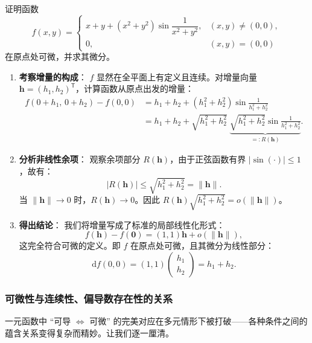 \documentclass[lang=cn,11pt]{elegantbook}
\begin{document}
\begin{exercise}[证明某函数在原点可微] \label{ex:diff-prove}
证明函数
\[
f(x,y)=
\begin{cases}
x+y+(x^2+y^2)\sin\dfrac{1}{x^2+y^2},&(x,y) \neq (0,0),\\[8pt]
0,&(x,y)=(0,0)
\end{cases}
\]
在原点处可微，并求其微分。
\end{exercise}

\begin{solution}
\begin{enumerate}
  \item \textbf{考察增量的构成}：
  $f$ 显然在全平面上有定义且连续。对增量向量 $\boldsymbol h=(h_1,h_2)^{\mathsf T}$，计算函数从原点出发的增量：
  \begin{align*}
  f(0+h_1,\,0+h_2)-f(0,0) &=h_1+h_2+(h_1^2+h_2^2)\sin\frac{1}{h_1^2+h_2^2}\\
  &=h_1+h_2+\sqrt{h_1^2+h_2^2}\; \underbrace{\sqrt{h_1^2+h_2^2}\sin\frac{1}{h_1^2+h_2^2}}_{\displaystyle=:R(\boldsymbol h)}.
  \end{align*}
  
  \item \textbf{分析非线性余项}：
  观察余项部分 $R(\boldsymbol h)$，由于正弦函数有界 $|\sin(\cdot)|\leqslant  1$，故有：
  \[
  |R(\boldsymbol h)|\leq\sqrt{h_1^2+h_2^2}=\|\boldsymbol h\|.
  \]
  当 $\|\boldsymbol h\|\to 0$ 时，$R(\boldsymbol h)\to 0$。因此 $R(\boldsymbol h)\sqrt{h_1^2+h_2^2} = o(\|\boldsymbol h\|)$。
  
  \item \textbf{得出结论}：
  我们将增量写成了标准的局部线性化形式：
  \[
  f(\boldsymbol h)-f(\boldsymbol 0)=(1,1)\boldsymbol h+o(\|\boldsymbol h\|),
  \]
  这完全符合可微的定义。即 $f$ 在原点处可微，且其微分为线性部分：
  \[
  \boxed{\mathrm{d}f(0,0)=(1,1)\begin{pmatrix}h_1\\h_2\end{pmatrix} = h_1 + h_2}.
  \]

\end{enumerate}
\end{solution}


\subsubsection{可微性与连续性、偏导数存在性的关系}

一元函数中 ``可导 $\Leftrightarrow$ 可微'' 的完美对应在多元情形下被打破——各种条件之间的蕴含关系变得复杂而精妙。让我们逐一厘清。
\end{document}
